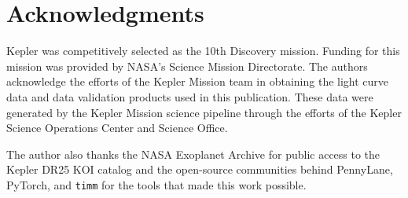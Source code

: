 \documentclass{article}
\begin{document}
\section*{Acknowledgments}

Kepler was competitively selected as the 10th Discovery mission. Funding for
this mission was provided by NASA's Science Mission Directorate. The authors
acknowledge the efforts of the Kepler Mission team in obtaining the light curve
data and data validation products used in this publication. These data were
generated by the Kepler Mission science pipeline through the efforts of the
Kepler Science Operations Center and Science Office.

The author also thanks the NASA Exoplanet Archive for public access to the
Kepler DR25 KOI catalog and the open-source communities behind PennyLane,
PyTorch, and \texttt{timm} for the tools that made this work possible.



\end{document}
